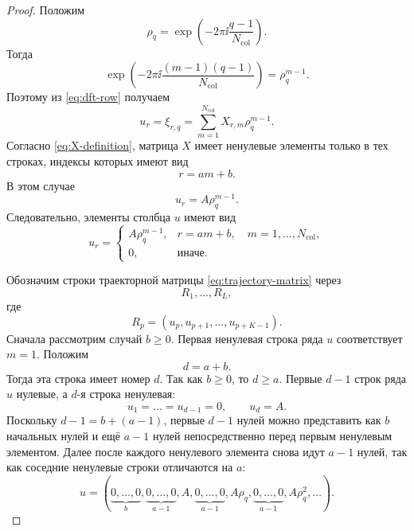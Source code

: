 \begin{proof}
Положим
\begin{equation*}
    \rho_q
    =
    \exp\left(
        -2\pi\ii\frac{q-1}{N_{\mathrm{col}}}
    \right).
\end{equation*}
Тогда
\begin{equation*}
    \exp\left(
        -2\pi\ii\frac{(m-1)(q-1)}{N_{\mathrm{col}}}
    \right)
    =
    \rho_q^{m-1}.
\end{equation*}
Поэтому из \eqref{eq:dft-row} получаем
\begin{equation*}
    u_r
    =
    \xi_{r,q}
    =
    \sum_{m=1}^{N_{\mathrm{col}}} X_{r,m}\rho_q^{m-1}.
\end{equation*}
Согласно \eqref{eq:X-definition}, матрица $X$ имеет ненулевые элементы только в тех строках, индексы которых имеют вид
\begin{equation*}
    r=am+b.
\end{equation*}
В этом случае
\begin{equation*}
    u_r=A\rho_q^{m-1}.
\end{equation*}
Следовательно, элементы столбца $u$ имеют вид
\begin{equation}
    u_r
    =
    \begin{cases}
        A\rho_q^{m-1}, & r=am+b,\quad m=1,\dots,N_{\mathrm{col}},\\
        0, & \text{иначе}.
    \end{cases}
    \label{eq:u-structure}
\end{equation}

Обозначим строки траекторной матрицы \eqref{eq:trajectory-matrix} через
\begin{equation*}
    R_1,\dots,R_L,
\end{equation*}
где
\begin{equation*}
    R_p=(u_p,u_{p+1},\dots,u_{p+K-1}).
\end{equation*}
Сначала рассмотрим случай $b\ge0$. Первая ненулевая строка ряда $u$
соответствует $m=1$. Положим
\begin{equation*}
    d=a+b.
\end{equation*}
Тогда эта строка имеет номер $d$. Так как $b\ge0$, то $d\ge a$. Первые $d-1$ строк ряда $u$ нулевые, а $d$-я строка ненулевая:
\begin{equation}
    u_1=\dots=u_{d-1}=0,
    \qquad
    u_d=A.
    \label{eq:first-nonzero}
\end{equation}
Поскольку $d-1=b+(a-1)$, первые $d-1$ нулей можно представить как $b$
начальных нулей и ещё $a-1$ нулей непосредственно перед первым ненулевым
элементом. Далее после каждого ненулевого элемента снова идут $a-1$ нулей,
так как соседние ненулевые строки отличаются на $a$:
\begin{equation*}
    u=
    (\underbrace{0,\dots,0}_{b},
    \underbrace{0,\dots,0}_{a-1},
    A,
    \underbrace{0,\dots,0}_{a-1},
    A\rho_q,
    \underbrace{0,\dots,0}_{a-1},
    A\rho_q^2,
    \dots).
\end{equation*}


\end{proof}
